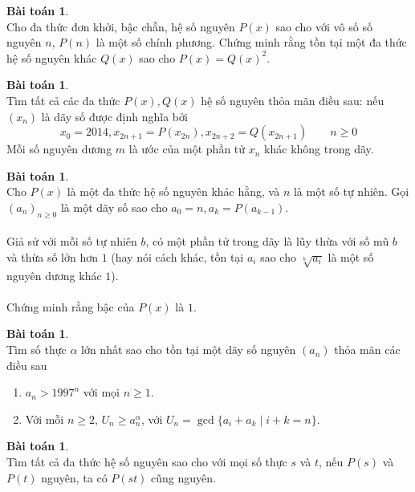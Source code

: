\documentclass{article}
\theoremstyle{definition}
\newtheorem{exercise}[theorem]{Bài toán}
\begin{document}
\begin{exercise} \ \\
Cho đa thức đơn khởi, bậc chẵn, hệ số nguyên $P(x)$ sao cho với vô số số nguyên $n$, $P(n)$ là một số chính phương. Chứng minh rằng tồn tại một đa thức hệ số nguyên khác $Q(x)$ sao cho $P(x) = Q(x)^2$.
\end{exercise}
\begin{exercise} \ \\
Tìm tất cả các đa thức $P(x), Q(x)$ hệ số nguyên thỏa mãn điều sau: nếu $(x_n)$ là dãy số được định nghĩa bởi
$$x_0 = 2014, x_{2n + 1} = P(x_{2n}), x_{2n + 2} = Q(x_{2n + 1}) \qquad n \geq 0$$
Mỗi số nguyên dương $m$ là ước của một phần tử $x_n$ khác không trong dãy.
\end{exercise}
\begin{exercise} \ \\
Cho $P(x)$ là một đa thức hệ số nguyên khác hằng, và $n$ là một số tự nhiên. Gọi $(a_n)_{n \geq 0}$ là một dãy số sao cho $a_0 = n, a_k = P(a_{k - 1})$.
\\
\\
Giả sử với mỗi số tự nhiên $b$, có một phần tử trong dãy là lũy thừa với số mũ $b$ và thừa số lớn hơn $1$ (hay nói cách khác, tồn tại $a_i$ sao cho $\sqrt[b]{a_i}$ là một số nguyên dương khác $1$).
\\
\\
Chứng minh rằng bậc của $P(x)$ là $1$.
\end{exercise}
\begin{exercise} \ \\
Tìm số thực $\alpha$ lớn nhất sao cho tồn tại một dãy số nguyên $(a_n)$ thỏa mãn các điều sau
\begin{enumerate}
	\item $a_n > 1997^n$ với mọi $n \geq 1$.
	\item Với mỗi $n \geq 2$, $U_n \geq a_n^\alpha$, với $U_n = \gcd \{ a_i + a_k \mid i + k = n \}$.
\end{enumerate}
\end{exercise}
\begin{exercise} \ \\
Tìm tất cả đa thức hệ số nguyên sao cho với mọi số thực $s$ và $t$, nếu $P(s)$ và $P(t)$ nguyên, ta có $P(st)$ cũng nguyên.
\end{exercise}
\ \\
\end{document}
